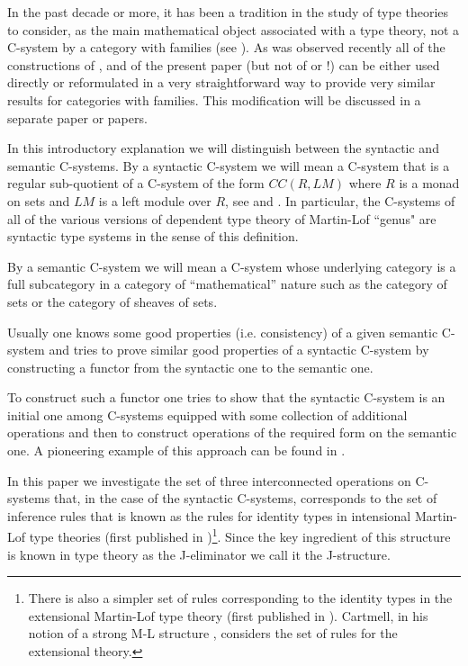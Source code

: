 \documentclass[12pt]{article}
\numberwithin{equation}{section}
\newcommand{\toCC}{CC} %
\begin{document}
In the past decade or more, it has been a tradition in the study of type
theories to consider, as the main mathematical object associated with a type
theory, not a C-system by a category with families (see \cite{Dybjer}). As was
observed recently all of the constructions of \cite{Cfromauniverse},
\cite{fromunivwithPi} and of the present paper (but not of \cite{Csubsystems}
or \cite{Cofamodule}!) can be either used directly or reformulated in a very
straightforward way to provide very similar results for categories with
families. This modification will be discussed in a separate paper or papers.

In this introductory explanation we will distinguish between the syntactic and
semantic C-systems. By a syntactic C-system we will mean a C-system that is a
regular sub-quotient of a C-system of the form $\toCC(R,LM)$ where $R$ is a monad
on sets and $LM$ is a left module over $R$, see \cite{Cofamodule} and
\cite{Csubsystems}. In particular, the C-systems of all of the various versions
of dependent type theory of Martin-Lof ``genus" are syntactic type systems in
the sense of this definition.

By a semantic C-system we will mean a C-system whose underlying category is a
full subcategory in a category of ``mathematical'' nature such as the category
of sets or the category of sheaves of sets.

Usually one knows some good properties (i.e. consistency) of a given semantic
C-system and tries to prove similar good properties of a syntactic C-system by
constructing a functor from the syntactic one to the semantic one.

To construct such a functor one tries to show that the syntactic C-system is an
initial one among C-systems equipped with some collection of additional
operations and then to construct operations of the required form on the
semantic one. A pioneering example of this approach can be found in
\cite{Streicher}.

In this paper we investigate the set of three interconnected operations on
C-systems that, in the case of the syntactic C-systems, corresponds to the set
of inference rules that is known as the rules for identity types in intensional
Martin-Lof type theories (first published in \cite{MLTT73})\footnote{There is
  also a simpler set of rules corresponding to the identity types in the
  extensional Martin-Lof type theory (first published in
  \cite{MLTT79}). Cartmell, in his notion of a strong M-L structure
  \cite[p.3.36]{Cartmell0}, considers the set of rules for the extensional
  theory.}. Since the key ingredient of this structure is known in type theory
as the J-eliminator we call it the J-structure.
\end{document}
